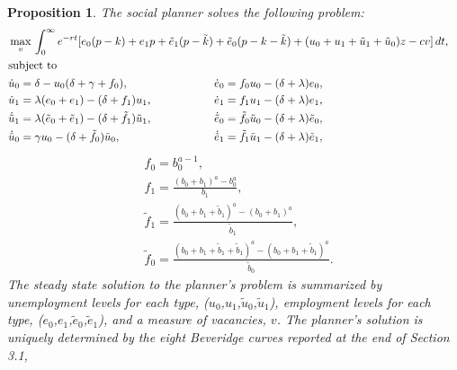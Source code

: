 \documentclass[12pt]{article} %
\newtheorem{proposition}{Proposition}
\theoremstyle{definition}
\begin{document}
\begin{proposition}\label{prop SSPP}
\indent The social planner solves the following problem: 
\begin{align*}
   &\max_{v}
   \begin{aligned}[t]
      &\int_{0}^{\infty} e^{-rt}[e_0(p-k) + e_1p + \tilde{e}_1(p-\tilde{k}) + \tilde{e}_0(p-k-\tilde{k}) +(u_0 + u_1 + \tilde{u}_1 + \tilde{u}_0)z -cv ] \,dt, 
   \end{aligned}  \notag \\
   &\text{subject to} \notag \\
   &\begin{aligned}
   \begin{split}
   & \dot{u}_0 =\delta - u_0(\delta + \gamma + f_0), \\
   & \dot{u}_1 = \lambda(e_0 + e_1) - (\delta + f_1)u_1, \\
   & \dot{\tilde{u}}_1=\lambda( \tilde{e}_0 + \tilde{e}_1) - (\delta + \tilde{f}_1)\tilde{u}_1, \\
   &\dot{\tilde{u}}_0 = \gamma u_0 - (\delta + \tilde{f}_0)\tilde{u}_0, 
   \end{split}
   \hspace{2cm}
   \begin{split}
   &\dot{e}_0 = f_0u_0 - (\delta + \lambda)e_0, \\
   &\dot{e}_1 = f_1u_1 - (\delta + \lambda)e_1, \\
   &\dot{\tilde{e}}_0=\tilde{f}_0\tilde{u}_0 - (\delta + \lambda)\tilde{e}_0, \\
   &\dot{\tilde{e}}_1=\tilde{f}_1\tilde{u}_1 - (\delta + \lambda)\tilde{e}_1, 
   \end{split}
   \end{aligned}
   \end{align*}
      \begin{align*}
   &f_0=b_0^{a-1}, \\
   &f_1=\frac{(b_0 + b_1)^a - b_0^a}{b_1}, \\
   &\tilde{f}_1=\frac{(b_0 + b_1 +\tilde{b}_1)^a - (b_0+b_1)^a}{\tilde{b}_1}, \\
   &\tilde{f}_0=\frac{(b_0 + b_1 + \tilde{b}_1 + \tilde{b}_1)^a - (b_0 + b_1 + \tilde{b}_1)^a}{\tilde{b}_0}.
\end{align*} The steady state solution to the planner's problem is summarized by unemployment levels for each type, ($u_0$,$u_1$,$\tilde{u}_0$,$\tilde{u}_1$), employment levels for each type, ($e_0$,$e_1$,$\tilde{e}_0$,$\tilde{e}_1$), and a measure of vacancies, $v$. The planner's solution is uniquely determined by the eight Beveridge curves reported at the end of Section 3.1,

\end{proposition}
\end{document}
